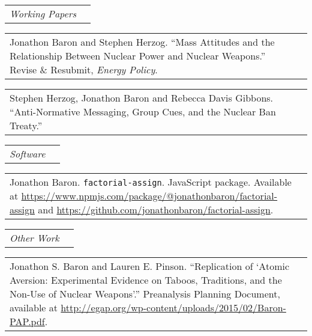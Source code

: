\documentclass[11pt]{article}
\begin{document}
\vspace{0.13in}
\begin{tabular*}{7.1in}{p{6.925in}p{3cm}}
{\large {\emph{Working Papers}}}
\end{tabular*} 
	
\vspace{0.13in}

\begin{tabular*}{7.1in}{p{6.925in}p{3cm}}
Jonathon Baron and Stephen Herzog. ``Mass Attitudes and the Relationship Between Nuclear Power and Nuclear Weapons.'' Revise \& Resubmit, \textit{Energy Policy}.
\end{tabular*}

\vspace{0.13in}

\begin{tabular*}{7.1in}{p{6.925in}p{3cm}}
Stephen Herzog, Jonathon Baron and Rebecca Davis Gibbons. ``Anti-Normative Messaging, Group Cues, and the Nuclear Ban Treaty.''
\end{tabular*}

\vspace{0.13in}

\begin{tabular*}{7.1in}{p{6.925in}p{3cm}}
{\large {\emph{Software}}}
\end{tabular*} 

\vspace{0.13in}

\begin{tabular*}{7.1in}{p{6.925in}p{3cm}}
Jonathon Baron. \verb+factorial-assign+. JavaScript package. Available at \url{https://www.npmjs.com/package/@jonathonbaron/factorial-assign} and \url{https://github.com/jonathonbaron/factorial-assign}.
\end{tabular*}

\vspace{0.13in}

\begin{tabular*}{7.1in}{p{6.925in}p{3cm}}
{\large {\emph{Other Work}}}
\end{tabular*} 
	
\vspace{0.13in}

\begin{tabular*}{7.1in}{p{6.925in}p{3cm}}
Jonathon S. Baron and Lauren E. Pinson. ``Replication of `Atomic Aversion: Experimental Evidence on Taboos, Traditions, and the Non-Use of Nuclear Weapons'.'' Preanalysis Planning Document, available at \url{http://egap.org/wp-content/uploads/2015/02/Baron-PAP.pdf}. 
\end{tabular*}
\end{document}

